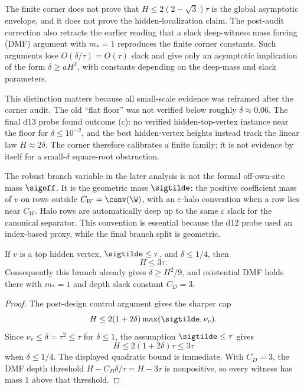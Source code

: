 \begin{downgradedstatement}
\downgradedbadge
The finite corner does not prove that \(H\le 2(2-\sqrt3)\tau\) is the global
asymptotic envelope, and it does not prove the hidden-localization claim.  The
post-audit correction also retracts the earlier reading that a slack
deep-witness mass forcing (DMF) argument with \(m_*=1\) reproduces the finite
corner constants.  Such arguments lose \(O(\delta/\tau)=O(\tau)\) slack and
give only an asymptotic implication of the form \(\delta\ge aH^2\), with
constants depending on the deep-mass and slack parameters.
\end{downgradedstatement}

This distinction matters because all small-scale evidence was reframed after
the corner audit.  The old ``flat floor'' was not verified below roughly
\(\delta\approx0.06\).  The final d13 probe found outcome (c): no verified
hidden-top-vertex instance near the floor for \(\delta\le10^{-2}\), and the
best hidden-vertex heights instead track the linear law \(H\approx2\delta\).
The corner therefore calibrates a finite family; it is not evidence by itself
for a small-\(\delta\) square-root obstruction.

The robust branch variable in the later analysis is not the formal off-own-site
mass \(\sigoff\).  It is the geometric mass \(\sigtilde\): the positive
coefficient mass of \(v\) on rows outside \(C_W=\conv(\W)\), with an
\(\varepsilon\)-halo convention when a row lies near \(C_W\).  Halo rows are
automatically deep up to the same \(\varepsilon\) slack for the canonical
separator.  This convention is essential because the d12 probe used an
index-based proxy, while the final branch split is geometric.

\begin{proposition}
\provedbadge
If \(v\) is a top hidden vertex, \(\sigtilde\le\tau\), and \(\delta\le1/4\), then
\[
  H\le 3\tau .
\]
Consequently this branch already gives \(\delta\ge H^2/9\), and existential
DMF holds there with \(m_*=1\) and depth slack constant \(C_D=3\).
\end{proposition}

\begin{proof}
The post-design control argument gives the sharper cap
\[
  H\le 2(1+2\delta)\max(\sigtilde,\nu_v).
\]
Since \(\nu_v\le\delta=\tau^2\le\tau\) for \(\delta\le1\), the assumption
\(\sigtilde\le\tau\) gives
\[
  H\le 2(1+2\delta)\tau\le 3\tau
\]
when \(\delta\le1/4\).  The displayed quadratic bound is immediate.  With
\(C_D=3\), the DMF depth threshold \(H-C_D\delta/\tau=H-3\tau\) is nonpositive,
so every witness has mass \(1\) above that threshold.
\end{proof}

